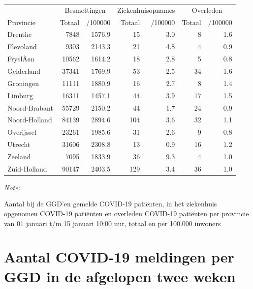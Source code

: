 \documentclass[
  english,
  man,floatsintext]{apa6}
\begin{document}
\begin{table}
\centering
\begin{threeparttable}
\begin{tabular}{lrrrrrr}
\toprule
\multicolumn{1}{c}{ } & \multicolumn{2}{c}{Besmettingen} & \multicolumn{2}{c}{Ziekenhuisopnames} & \multicolumn{2}{c}{Overleden} \\
\cmidrule(l{3pt}r{3pt}){2-3} \cmidrule(l{3pt}r{3pt}){4-5} \cmidrule(l{3pt}r{3pt}){6-7}
Provincie & Totaal & /100000 & Totaal & /100000 & Totaal & /100000\\
\midrule
Drenthe & 7848 & 1576.9 & 15 & 3.0 & 8 & 1.6\\
Flevoland & 9303 & 2143.3 & 21 & 4.8 & 4 & 0.9\\
FryslÃ¢n & 10562 & 1614.2 & 18 & 2.8 & 5 & 0.8\\
Gelderland & 37341 & 1769.9 & 53 & 2.5 & 34 & 1.6\\
Groningen & 11111 & 1880.9 & 16 & 2.7 & 8 & 1.4\\
Limburg & 16311 & 1457.1 & 44 & 3.9 & 17 & 1.5\\
Noord-Brabant & 55729 & 2150.2 & 44 & 1.7 & 24 & 0.9\\
Noord-Holland & 84139 & 2894.6 & 104 & 3.6 & 32 & 1.1\\
Overijssel & 23261 & 1985.6 & 31 & 2.6 & 9 & 0.8\\
Utrecht & 31606 & 2308.8 & 13 & 0.9 & 16 & 1.2\\
Zeeland & 7095 & 1833.9 & 36 & 9.3 & 4 & 1.0\\
Zuid-Holland & 90147 & 2403.5 & 129 & 3.4 & 36 & 1.0\\
\bottomrule
\end{tabular}
\begin{tablenotes}
\item \textit{Note: } 
\item Aantal bij de GGD’en gemelde COVID-19 patiënten, in het ziekenhuis opgenomen COVID-19 patiënten en overleden COVID-19 patiënten per provincie van 01 januari t/m 15 januari 10:00 uur, totaal en per 100.000 inwoners
\end{tablenotes}
\end{threeparttable}
\end{table}

\newpage

\hypertarget{aantal-covid-19-meldingen-per-ggd-in-de-afgelopen-twee-weken}{%
\section{Aantal COVID-19 meldingen per GGD in de afgelopen twee weken}\label{aantal-covid-19-meldingen-per-ggd-in-de-afgelopen-twee-weken}}
\end{document}
